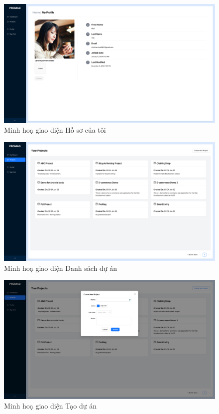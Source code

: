 \documentclass[../DoAn.tex]{subfiles}
\begin{document}
\begin{figure}[H]
    \centering
    \includegraphics[width=1.0\linewidth]{Hinhve/Screenshot_MyProfile.png}
    \caption{Minh hoạ giao diện Hồ sơ của tôi}
    \label{fig:Screenshot_MyProfile}
\end{figure}

\newpage

\begin{figure}[H]
    \centering
    \includegraphics[width=1.0\linewidth]{Hinhve/Screenshot_ProjectList.png}
    \caption{Minh hoạ giao diện Danh sách dự án}
    \label{fig:Screenshot_ProjectList}
\end{figure}

\begin{figure}[H]
    \centering
    \includegraphics[width=1.0\linewidth]{Hinhve/Screenshot_CreateProject.png}
    \caption{Minh hoạ giao diện Tạo dự án}
    \label{fig:Screenshot_CreateProject}
\end{figure}
\end{document}

